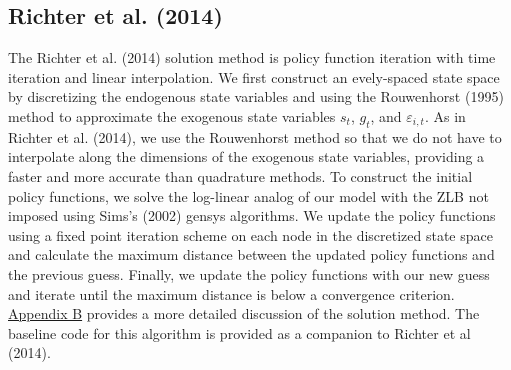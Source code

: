 \documentclass[12pt, final]{article}
\begin{document}
\subsection{Richter et al. (2014)}
The Richter et al. (2014) solution method is policy function iteration with time iteration and linear interpolation. We first construct an evely-spaced state space by discretizing the endogenous state variables and using the Rouwenhorst (1995) method to approximate the exogenous state variables $s_t$, $g_t$, and $\varepsilon_{i,t}$. As in Richter et al. (2014), we use the Rouwenhorst method so that we do not have to interpolate along the dimensions of the exogenous state variables, providing a faster and more accurate than quadrature methods. To construct the initial policy functions, we solve the log-linear analog of our model with the ZLB not imposed using Sims's (2002) gensys algorithms. We update the policy functions using a fixed point iteration scheme on each node in the discretized state space and calculate the maximum distance between the updated policy functions and the previous guess. Finally, we update the policy functions with our new guess and iterate until the maximum distance is below a convergence criterion. \hyperlink{Appendix B}{Appendix B} provides a more detailed discussion of the solution method. The baseline code for this algorithm is provided as a companion to Richter et al (2014). 
\end{document}
